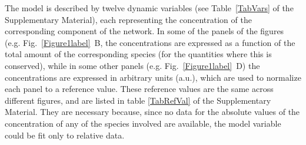 \documentclass[oneside, 10pt, a4paper, twocolumn]{article}
\begin{document}
The model is described by twelve dynamic variables (see Table~\ref{TabVars} of the Supplementary Material), 
each representing the concentration of the corresponding component of the network. 
In some of the panels of the figures (e.g. Fig.~\ref{Figure1label}~B, the concentrations are expressed as a function of the total amount of the corresponding species (for the quantities where this is conserved), while in some other panels (e.g. Fig.~\ref{Figure1label}~D) the concentrations are expressed in arbitrary units (a.u.), which are used to normalize each panel to a reference value. These reference values are the same across different figures, and are listed in table \ref{TabRefVal} of the Supplementary Material. They are necessary because, since no data for the absolute values of the concentration of any of the species involved are available, the model variable could be fit only to relative data.
\end{document}
